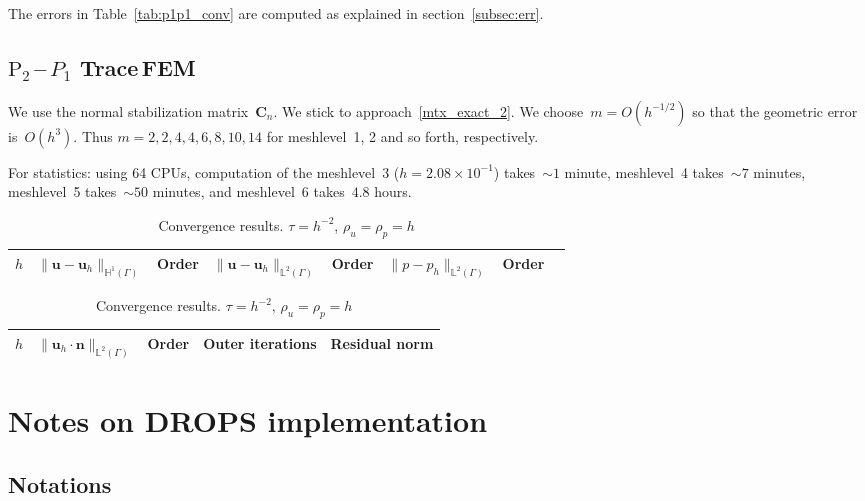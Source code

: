 \documentclass[12pt]{article}
\newcommand{\vect}[1]{\boldsymbol{\mathbf{#1}}}
\newcommand{\LTwoSpace}[1][\Gamma]{{\mathbb L^2\left({#1}\right)}}
\newcommand{\HOneSpace}[1][\Gamma]{{\mathbb H^1\left({#1}\right)}}
\begin{document}
The errors in Table~\ref{tab:p1p1_conv} are computed as explained in section~\ref{subsec:err}.

\clearpage

\subsection{$\text{P}_2$\,--\,$P_1$ Trace\,FEM}

We use the normal stabilization matrix~$\vect C_n$. We stick to approach~\eqref{mtx_exact_2}. We choose~$m = O(h^{-1/2})$ so that the geometric error is~$O(h^3)$. Thus $m = 2, 2, 4, 4, 6, 8, 10, 14$ for meshlevel~1, 2 and so forth, respectively.

For statistics: using 64 CPUs, computation of the meshlevel~3 ($h = 2.08\times10^{-1}$) takes~${\sim}1$ minute, meshlevel~4 takes~${\sim}7$ minutes, meshlevel~5 takes~${\sim}50$ minutes, and meshlevel~6 takes~$4.8$ hours.

\begin{table}[h!]
	\centering\small
	\caption{Convergence results. $\tau = h^{-2}$, $\rho_u = \rho_p = h$}
	\label{tab:p2p1_conv}
	\begin{subtable}{1.\linewidth}\centering
		\begin{tabular}[1.3]{|c||c|c||c|c||c||c|c|}
			\hline
			$h$ & $\|\vect u - \vect u_h\|_{\HOneSpace}$ & Order & $\|\vect u - \vect u_h\|_{\LTwoSpace}$ & Order & $\|p - p_h\|_{\LTwoSpace}$ & Order \\
			\hline
			
		\end{tabular}
	\end{subtable}
	\vskip 4mm	
	\begin{subtable}{1.\linewidth}\centering
		\begin{tabular}[1.3]{|c||c|c||c||c|}
			\hline
			$h$ & $\| \vect u_h\cdot\vect n \|_{\LTwoSpace}$ & Order & Outer iterations & Residual norm \\
			\hline
			
		\end{tabular}
	\end{subtable}
\end{table}

\section{Notes on DROPS implementation}

\subsection{Notations}\label{subsec:not}
\end{document}

